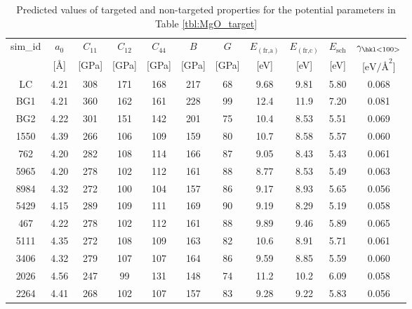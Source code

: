 \begin{table}[ht]
	\caption{Predicted values of targeted and non-targeted properties for the potential parameters in Table \ref{tbl:MgO_target}}
  \label{tbl:MgO_best_qoi}
	\centering
	\begin{tabular}{ccccccccccc}
		\hline
	  sim\_id &	$a_0$ & $C_{11}$ & $C_{12}$ & $C_{44}$ & $B$ & $G$ &
		          $E_(\text{fr,a})$ & $E_(\text{fr,c})$ & $E_{\text{sch}}$ &
							$\gamma_{\text{\hkl<100>}}$ \\
		        & [\AA] & [GPa] & [GPa] & [GPa] & [GPa] & [GPa] &
						  [eV] & [eV] & [eV] &
							[$\text{eV/\AA}^2$] \\
	  \hline
		LC   & 4.21 & 308 & 171 & 168 & 217 & 68 & 9.68 & 9.81 & 5.80 & 0.068 \\
		BG1  & 4.21 & 360 & 162 & 161 & 228 & 99 & 12.4 & 11.9 & 7.20 & 0.081 \\
		BG2 & 4.22 & 301 & 151 & 142 & 201 & 75 & 10.4 & 8.53 & 5.51 & 0.069 \\
		1550 & 4.39 & 266 & 106 &	109 & 159 & 80 & 10.7 & 8.58 & 5.57 & 0.060 \\
		762 & 4.20 & 282 & 108 & 114 & 166 & 87 & 9.05 & 8.43 & 5.43 & 0.061 \\
		5965 & 4.20 & 278 & 102 & 112 & 161 & 88 & 8.77 & 8.53 & 5.49 & 0.063 \\
		8984 & 4.32 & 272 & 100 & 104 & 157 & 86 & 9.17 & 8.93 & 5.65 & 0.056 \\
		5429 & 4.15 & 289 & 109 & 111 & 169 & 90 & 9.19 & 8.29 & 5.19 & 0.058 \\
		467 & 4.22 & 278 & 102 & 112 & 161 & 88 & 9.89 & 9.46 & 5.89 & 0.065 \\
		5111 & 4.35 & 272 & 108 & 109 & 163 & 82 & 10.6 & 8.91 & 5.71 & 0.061 \\
		3406 & 4.32 & 279 & 107 & 107 & 164 & 86 & 9.59 & 8.85 & 5.59 & 0.060 \\
		2026 & 4.56 & 247 & 99 & 131 & 148 & 74 & 11.2 & 10.2 & 6.09 & 0.058 \\
		2264 & 4.41 & 268 & 102 & 107 & 157 & 83 & 9.28 & 9.22 & 5.83 & 0.056 \\
		\hline
	\end{tabular}
\end{table}

